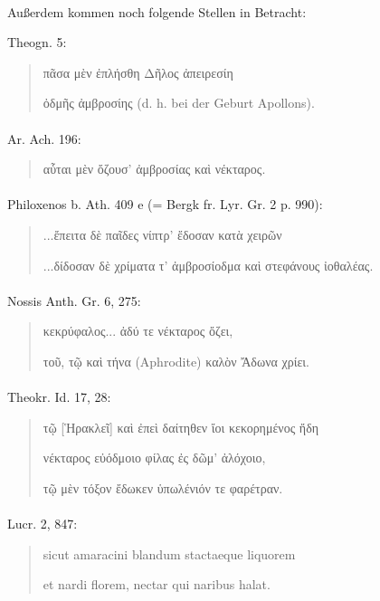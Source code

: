 \documentclass[a4paper, 11pt, oneside]{article}
\begin{document}
\paragraph{}
Außerdem kommen noch folgende Stellen in Betracht:

Theogn. 5:
\begin{quotation}
πᾶσα μὲν ἐπλήσθη Δῆλος ἀπειρεσίη

ὀδμῆς ἀμβροσίης (d. h. bei der Geburt Apollons).
\end{quotation}
\paragraph{}
Ar. Ach. 196:
\begin{quotation}
αὗται μὲν ὄζουσ' ἀμβροσίας καὶ νέκταρος.
\end{quotation}
\paragraph{}
Philoxenos b. Ath. 409 e (= Bergk fr. Lyr. Gr. 2 p. 990):
\begin{quotation}
...ἔπειτα δὲ παῖδες νίπτρ' ἔδοσαν κατὰ χειρῶν

...δίδοσαν δὲ χρίματα τ' ἀμβροσίοδμα καὶ στεφάνους ἰοθαλέας.
\end{quotation}
\paragraph{}
Nossis Anth. Gr. 6, 275:
\begin{quotation}
κεκρύφαλος... ἀδύ τε νέκταρος ὄζει,

τοῦ, τῷ καὶ τήνα (Aphrodite) καλὸν Ἄδωνα χρίει.
\end{quotation}
\paragraph{}
Theokr. Id. 17, 28:
\begin{quotation}
τῷ [Ἡρακλεῖ] καὶ ἐπεὶ δαίτηθεν ἴοι κεκορημένος ἤδη

νέκταρος εὐόδμοιο φίλας ἐς δῶμ' ἀλόχοιο,

τῷ μὲν τόξον ἔδωκεν ὑπωλένιόν τε φαρέτραν.
\end{quotation}
\paragraph{}
Lucr. 2, 847:
\begin{quotation}
sicut amaracini blandum stactaeque liquorem

et nardi florem, nectar qui naribus halat.
\end{quotation}
\end{document}
